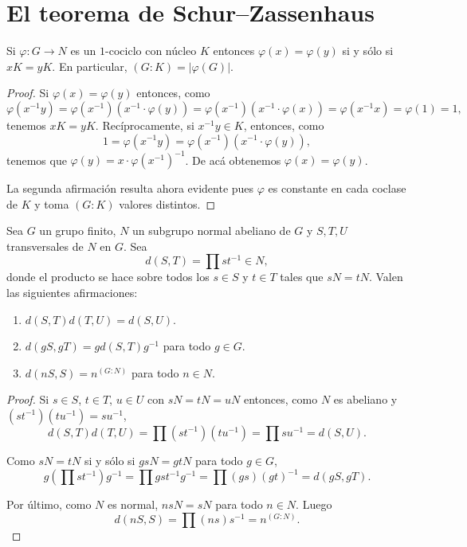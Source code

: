 \chapter{El teorema de Schur--Zassenhaus}

\begin{lemma}
	\label{lemma:1cocycle}
	Si $\varphi\colon G\to N$ es un $1$-cociclo con núcleo $K$ entonces
	$\varphi(x)=\varphi(y)$ si y sólo si $xK=yK$. En particular,
	$(G:K)=|\varphi(G)|$. 
\end{lemma}

\begin{proof}
	Si $\varphi(x)=\varphi(y)$ entonces, como 
	\[
		\varphi(x^{-1}y)
		=\varphi(x^{-1})(x^{-1}\cdot\varphi(y))
		=\varphi(x^{-1})(x^{-1}\cdot\varphi(x))
		=\varphi(x^{-1}x)=\varphi(1)
		=1,
	\]
	tenemos $xK=yK$. Recíprocamente, si $x^{-1}y\in K$, entonces, como 
	\[
	1=\varphi(x^{-1}y)=\varphi(x^{-1})(x^{-1}\cdot \varphi(y)),
	\]
	tenemos que $\varphi(y)=x\cdot\varphi(x^{-1})^{-1}$. De acá obtenemos
	$\varphi(x)=\varphi(y)$.

	La segunda afirmación resulta ahora evidente pues $\varphi$ es constante en
	cada coclase de $K$ y toma $(G:K)$ valores distintos. 
\end{proof}

\begin{lemma}
	\label{lemma:d}
	Sea $G$ un grupo finito, $N$ un subgrupo normal abeliano de $G$ y $S,T,U$
	transversales de $N$ en $G$. Sea 
	\[
	d(S,T)=\prod st^{-1}\in N,
	\]
	donde el producto se hace sobre todos los $s\in S$ y $t\in T$ tales que
	$sN=tN$. Valen las siguientes afirmaciones:
	\begin{enumerate}
		\item $d(S,T)d(T,U)=d(S,U)$.
		\item $d(gS,gT)=gd(S,T)g^{-1}$ para todo $g\in G$.
		\item $d(nS,S)=n^{(G:N)}$ para todo $n\in N$.
	\end{enumerate}
\end{lemma}

\begin{proof}
	Si $s\in S$, $t\in T$, $u\in U$ con $sN=tN=uN$ entonces, como $N$ es
	abeliano y $(st^{-1})(tu^{-1})=su^{-1}$, 
	\[
		d(S,T)d(T,U)=\prod (st^{-1})(tu^{-1})=\prod su^{-1}=d(S,U).
	\]

	Como $sN=tN$ si y sólo si $gsN=gtN$ para todo $g\in G$, 
	\[
	g\left(\prod st^{-1}\right)g^{-1}=\prod gst^{-1}g^{-1}=\prod (gs)(gt)^{-1}=d(gS,gT).
	\]

	Por último, como $N$ es normal, $nsN=sN$ para todo $n\in N$. Luego
	\[
		d(nS,S)=\prod (ns)s^{-1}=n^{(G:N)}.
	\]
\end{proof}

